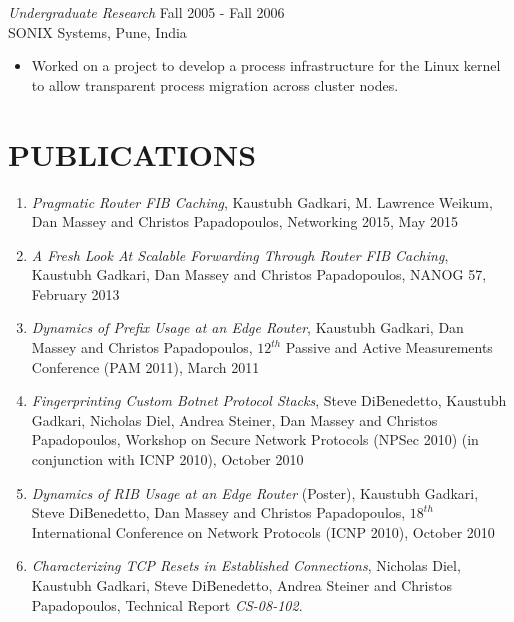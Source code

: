 \documentclass[line,margin]{res}
\begin{document}
\begin{resume}
    {\sl Undergraduate Research} \hfill Fall 2005 - Fall 2006\\
        SONIX Systems, Pune, India
        \begin{itemize} \itemsep -2pt
            \item Worked on a project to develop a process infrastructure for the Linux kernel to allow
            transparent process migration across cluster nodes.
        \end{itemize}

\section{PUBLICATIONS}
            \begin{enumerate}
              \item {\sl Pragmatic Router FIB Caching}, Kaustubh Gadkari, M. Lawrence Weikum, Dan Massey and
				  Christos Papadopoulos, Networking 2015, May 2015

		  	\item {\sl A Fresh Look At Scalable Forwarding Through Router FIB Caching}, Kaustubh Gadkari, Dan Massey and
              Christos Papadopoulos, NANOG 57, February 2013

              \item {\sl Dynamics of Prefix Usage at an Edge Router}, Kaustubh Gadkari, Dan Massey and Christos Papadopoulos,
              ${12^{th}}$ Passive and Active Measurements Conference (PAM 2011), March 2011

         	  \item {\sl Fingerprinting Custom Botnet Protocol Stacks}, Steve DiBenedetto, Kaustubh Gadkari, Nicholas Diel,
              Andrea Steiner, Dan Massey and Christos Papadopoulos, Workshop on Secure Network Protocols (NPSec 2010)
              (in conjunction with ICNP 2010), October 2010

              \item {\sl Dynamics of RIB Usage at an Edge Router} (Poster), Kaustubh Gadkari, Steve DiBenedetto,
               Dan Massey and Christos Papadopoulos, ${18^{th}}$ International Conference on Network Protocols (ICNP 2010), October 2010

               \item {\sl Characterizing TCP Resets in Established Connections}, Nicholas Diel, Kaustubh Gadkari, Steve DiBenedetto,
              Andrea Steiner and Christos Papadopoulos,
              Technical Report {\emph {CS-08-102}}.
             \end{enumerate}


\end{resume}
\end{document}
